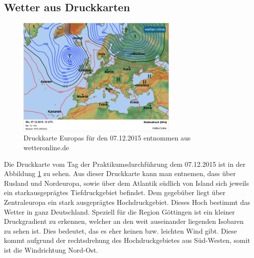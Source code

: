\documentclass[12pt,a4paper,titlepage,headinclude]{scrartcl}
\numberwithin{equation}{subsection}
\begin{document}
\subsection{Wetter aus Druckkarten}
\begin{figure}[!h]
\centering
\includegraphics[width=0.7\textwidth]{wetter0712.png}
\caption{Druckkarte Europas für den 07.12.2015 entnommen aus wetteronline.de}
\label{fig:w0712}
\end{figure}
Die Druckkarte vom Tag der Praktikumsdurchführung dem 07.12.2015 ist in der Abbildung \ref{fig:w0712} zu sehen.
Aus dieser Druckkarte kann man entnemen, dass über Rusland und Nordeuropa, sowie über dem Atlantik südlich von Island sich jeweils ein starkausgeprägtes Tiefdruckgebiet befindet.
Dem gegebüber liegt über Zentraleuropa ein stark ausgeprägtes Hochdruckgebiet.
Dieses Hoch bestimmt das Wetter in ganz Deutschland.
Speziell für die Region Göttingen ist ein kleiner Druckgradient zu erkennen, welcher an den weit auseinander liegenden Isobaren zu sehen ist.
Dies bedeutet, das es eher keinen bzw. leichten Wind gibt.
Diese kommt aufgrund der rechtsdrehung des Hochdruckgebietes aus Süd-Westen, somit ist die Windrichtung Nord-Ost.
\end{document}
